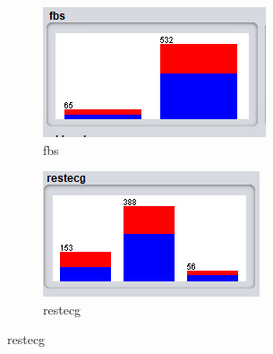 \begin{figure}[H]
\medskip
\begin{subfigure}{0.38\textwidth}
  \includegraphics[width=\linewidth]{2/8.png}
  \caption{fbs}
  \label{fig:4}
\end{subfigure}\hfil %
\begin{subfigure}{0.38\textwidth}
  \includegraphics[width=\linewidth]{2/9.png}
  \caption{restecg}
  \label{fig:6}
\end{subfigure}


\end{figure}
